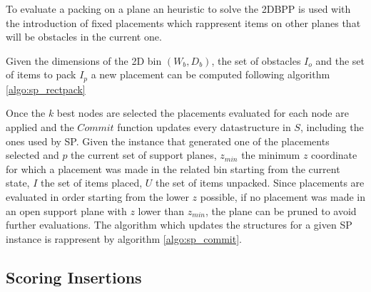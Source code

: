 To evaluate a packing on a plane an heuristic to solve the 2DBPP is used with the introduction of fixed placements which rappresent items on other planes that will be obstacles in the current one.


Given the dimensions of the 2D bin $(W_b, D_b)$, the set of obstacles $I_{o}$ and the set of items to pack $I_{p}$ a new placement can be computed following algorithm \ref{algo:sp_rectpack}



Once the $k$ best nodes are selected the placements evaluated for each node are applied and the $Commit$ function updates every datastructure in $S$, including the ones used by SP.
Given the instance that generated one of the placements selected and $p$ the current set of support planes, $z_{min}$ the minimum $z$ coordinate for which a placement was made in the related bin starting from the current state, $I$ the set of items placed, $U$ the set of items unpacked.
Since placements are evaluated in order starting from the lower $z$ possible, if no placement was made in an open support plane with $z$ lower than $z_{min}$, the plane can be pruned to avoid further evaluations.
The algorithm which updates the structures for a given SP instance is rappresent by algorithm \ref{algo:sp_commit}.



\subsection{Scoring Insertions}
\label{ssec:scoring_insertions}%